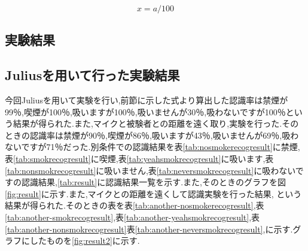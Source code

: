 \documentclass[12pt,oneside]{sotsuken_paper}
\begin{document}
\begin{equation}
  x = a / 100
\end{equation}
\label{eq:average}


\subsection{実験結果}
\subsection{Juliusを用いて行った実験結果}
今回Juliusを用いて実験を行い,前節に示した式より算出した認識率は禁煙が99％,喫煙が100％,吸いますが100％,吸いませんが30％,吸わないですが100％という結果が得られた.また,マイクと被験者との距離を遠く取り,実験を行った.そのときの認識率は禁煙が90％,喫煙が86％,吸いますが43％,吸いませんが69％,吸わないですが71％だった.別条件での認識結果を表\ref{tab:nosmokerecogresult}に禁煙,表\ref{tab:smokrecogresult}に喫煙,表\ref{tab:yeahsmokrecogresult}に吸います,表\ref{tab:nonsmokrecogresult}に吸いません,表\ref{tab:neversmokrecogresult}に吸わないですの認識結果,\ref{tab:result}に認識結果一覧を示す.また,そのときのグラフを図\ref{fig:result}に示す.また,マイクとの距離を遠くして認識実験を行った結果, という結果が得られた.そのときの表を表\ref{tab:another-nosmokerecogresult},表\ref{tab:another-smokrecogresult},表\ref{tab:another-yeahsmokrecogresult},表\ref{tab:another-nonsmokrecogresult}表\ref{tab:another-neversmokrecogresult},に示す.グラフにしたものを\ref{fig:result2}に示す.
\end{document}
